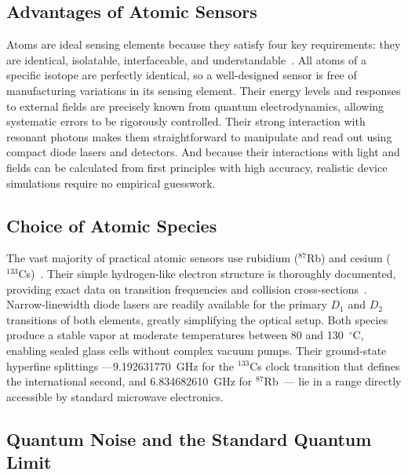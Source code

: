 \subsection{Advantages of Atomic Sensors}
\label{sec:advantages}

Atoms are ideal sensing elements because they satisfy four key
requirements: they are identical, isolatable, interfaceable, and
understandable~\cite{brown2025}. All atoms of a specific isotope
are perfectly identical, so a well-designed sensor is free of
manufacturing variations in its sensing element. Their energy
levels and responses to external fields are precisely known from
quantum electrodynamics, allowing systematic errors to be
rigorously controlled. Their strong interaction with resonant
photons makes them straightforward to manipulate and read out
using compact diode lasers and detectors. And because their
interactions with light and fields can be calculated from first
principles with high accuracy, realistic device simulations
require no empirical guesswork.

\subsection{Choice of Atomic Species}
\label{sec:species}

The vast majority of practical atomic sensors use rubidium
($^{87}$Rb) and cesium ($^{133}$Cs)~\cite{brown2025}. Their
simple hydrogen-like electron structure is thoroughly documented,
providing exact data on transition frequencies and collision
cross-sections~\cite{foot2005}. Narrow-linewidth diode lasers are
readily available for the primary $D_1$ and $D_2$ transitions of
both elements, greatly simplifying the optical setup. Both species
produce a stable vapor at moderate temperatures between 80 and
130~$^\circ$C, enabling sealed glass cells without complex vacuum
pumps. Their ground-state hyperfine splittings ---\SI{9.192631770}{GHz}
for the $^{133}$Cs clock transition that defines the international
second, and \SI{6.834682610}{GHz} for $^{87}$Rb~\cite{ginges2017}--- lie
in a range directly accessible by standard microwave electronics.

\subsection{Quantum Noise and the Standard Quantum Limit}
\label{sec:sql}

